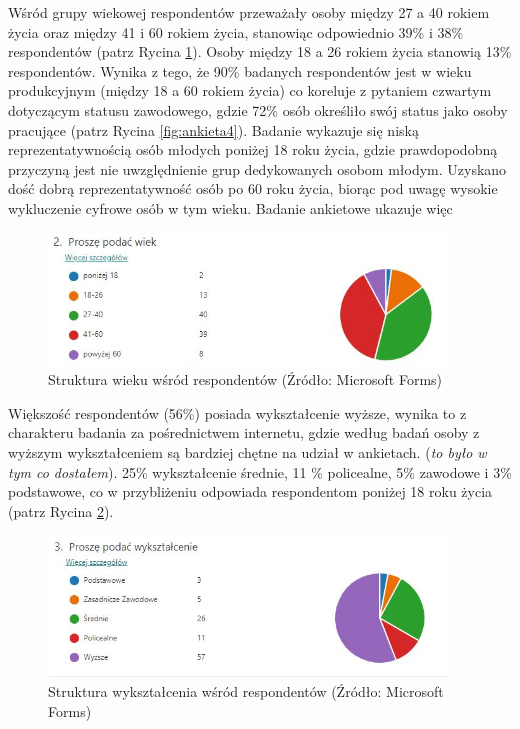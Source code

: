 \documentclass{amuthesis}
\begin{document}
Wśród grupy wiekowej respondentów przeważały osoby między 27 a 40 rokiem życia oraz między 41 i 60 rokiem życia, stanowiąc odpowiednio 39\% i 38\% respondentów (patrz Rycina \ref{fig:ankieta2}).
Osoby między 18 a 26 rokiem życia stanowią 13\% respondentów.
Wynika z tego, że 90\% badanych respondentów jest w wieku produkcyjnym (między 18 a 60 rokiem życia) co koreluje z pytaniem czwartym dotyczącym statusu zawodowego, gdzie 72\% osób określiło swój status jako osoby pracujące (patrz Rycina \ref{fig:ankieta4}).
Badanie wykazuje się niską reprezentatywnością osób młodych poniżej 18 roku życia, gdzie prawdopodobną przyczyną jest nie uwzględnienie grup dedykowanych osobom młodym.
Uzyskano dość dobrą reprezentatywność osób po 60 roku życia, biorąc pod uwagę wysokie wykluczenie cyfrowe osób w tym wieku.
Badanie ankietowe ukazuje więc

\begin{figure}[t]

{\centering \includegraphics[width=400px]{figures/ankieta/2} 

}

\caption{Struktura wieku wśród respondentów (Źródło: Microsoft Forms)}\label{fig:ankieta2}
\end{figure}

Większość respondentów (56\%) posiada wykształcenie wyższe, wynika to z charakteru badania za pośrednictwem internetu, gdzie według badań osoby z wyższym wykształceniem są bardziej chętne na udział w ankietach. (\emph{to było w tym co dostałem}).
25\% wykształcenie średnie, 11 \% policealne, 5\% zawodowe i 3\% podstawowe, co w przybliżeniu odpowiada respondentom poniżej 18 roku życia (patrz Rycina \ref{fig:ankieta3}).

\begin{figure}[t]

{\centering \includegraphics[width=400px]{figures/ankieta/3} 

}

\caption{Struktura wykształcenia wśród respondentów (Źródło: Microsoft Forms)}\label{fig:ankieta3}
\end{figure}
\end{document}
